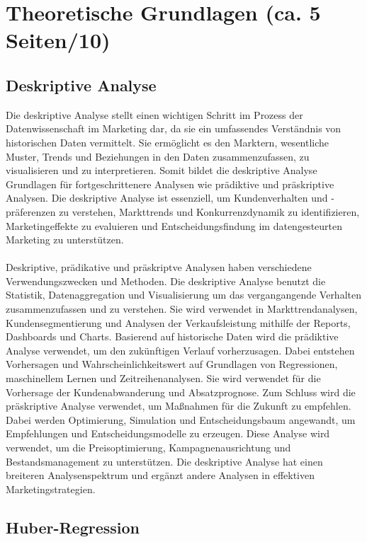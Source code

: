 \newpage
\section{Theoretische Grundlagen (ca. 5 Seiten/10)}
\subsection{Deskriptive Analyse}
\label{deskriptiveanalyse}
Die deskriptive Analyse stellt einen wichtigen Schritt im Prozess der Datenwissenschaft im Marketing dar, da sie ein umfassendes Verständnis von historischen Daten vermittelt. Sie ermöglicht es den Marktern, wesentliche Muster, Trends und Beziehungen in den Daten zusammenzufassen, zu visualisieren und zu interpretieren. Somit bildet die deskriptive Analyse Grundlagen für fortgeschrittenere Analysen wie prädiktive und präskriptive Analysen. Die deskriptive Analyse ist essenziell, um Kundenverhalten und -präferenzen zu verstehen, Markttrends und Konkurrenzdynamik zu identifizieren, Marketingeffekte zu evaluieren und Entscheidungsfindung im datengesteurten Marketing zu unterstützen\cite{brown2024mastering}. \\\\
Deskriptive, prädikative und präskriptve Analysen haben verschiedene Verwendungszwecken und Methoden. Die deskriptive Analyse benutzt die Statistik, Datenaggregation und Visualisierung um das vergangangende Verhalten zusammenzufassen und zu verstehen. Sie wird verwendet in Markttrendanalysen, Kundensegmentierung und Analysen der Verkaufsleistung mithilfe der Reports, Dashboards und Charts. Basierend auf historische Daten wird die prädiktive Analyse verwendet, um den zukünftigen Verlauf vorherzusagen. Dabei entstehen Vorhersagen und Wahrscheinlichkeitswert auf Grundlagen von Regressionen, maschinellem Lernen und Zeitreihenanalysen. Sie wird verwendet für die Vorhersage der Kundenabwanderung und Absatzprognose. Zum Schluss wird die präskriptive Analyse verwendet, um Maßnahmen für die Zukunft zu empfehlen. Dabei werden Optimierung, Simulation und Entscheidungsbaum angewandt, um Empfehlungen und Entscheidungsmodelle zu erzeugen. Diese Analyse wird verwendet, um die Preisoptimierung, Kampagnenausrichtung und Bestandsmanagement zu unterstützen. Die deskriptive Analyse hat einen breiteren Analysenspektrum und ergänzt andere Analysen in effektiven Marketingstrategien\cite[S. 51 ff]{brown2024mastering}. 



\subsection{Huber-Regression}
\label{huberregression}

